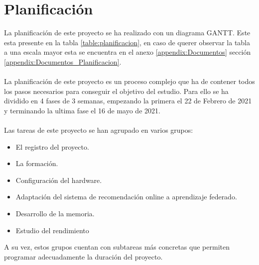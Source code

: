 \chapter{Planificación}
\thispagestyle{fancy}


La planificación de este proyecto se ha realizado con un diagrama GANTT. Este esta presente en la tabla \ref{table:planificacion}, en caso de querer observar la tabla a una escala mayor esta se encuentra en el anexo \ref{appendix:Documentos} sección \ref{appendix:Documentos_Planificacion}.
\\ \\
La planificación de este proyecto es un proceso complejo que ha de contener todos los pasos necesarios para conseguir el objetivo del estudio. Para ello se ha dividido en 4 fases de 3 semanas, empezando la primera el 22 de Febrero de 2021 y terminando la ultima fase el 16 de mayo de 2021.
\\ \\
Las tareas de este proyecto se han agrupado en varios grupos:
\begin{itemize}
    \item El registro del proyecto.
    \item La formación.
    \item Configuración del hardware.
    \item Adaptación del sistema de recomendación online a aprendizaje federado.
    \item Desarrollo de la memoria.
    \item Estudio del rendimiento
\end{itemize}
A su vez, estos grupos cuentan con subtareas más concretas que permiten programar adecuadamente la duración del proyecto.
